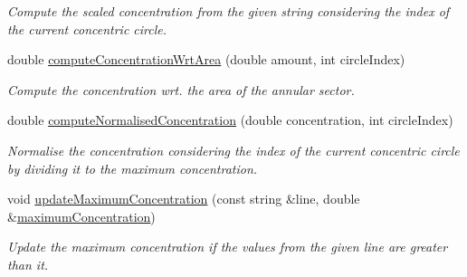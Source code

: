 \begin{DoxyCompactItemize}
\begin{DoxyCompactList}\small\item\em Compute the scaled concentration from the given string considering the index of the current concentric circle. \end{DoxyCompactList}\item 
double \hyperlink{classmultiscale_1_1video_1_1PolarCsvToInputFilesConverter_aa35b7d511b76a3c145e25886e2e76daa}{compute\-Concentration\-Wrt\-Area} (double amount, int circle\-Index)
\begin{DoxyCompactList}\small\item\em Compute the concentration wrt. the area of the annular sector. \end{DoxyCompactList}\item 
double \hyperlink{classmultiscale_1_1video_1_1PolarCsvToInputFilesConverter_a5fc03b210507a363037a694fdbc95b2b}{compute\-Normalised\-Concentration} (double concentration, int circle\-Index)
\begin{DoxyCompactList}\small\item\em Normalise the concentration considering the index of the current concentric circle by dividing it to the maximum concentration. \end{DoxyCompactList}\item 
void \hyperlink{classmultiscale_1_1video_1_1PolarCsvToInputFilesConverter_ae624c0a8fe97d266cbc127d64af707de}{update\-Maximum\-Concentration} (const string \&line, double \&\hyperlink{classmultiscale_1_1video_1_1PolarCsvToInputFilesConverter_a89b7dce2825cd5c8c45a1e6f19770e5f}{maximum\-Concentration})
\begin{DoxyCompactList}\small\item\em Update the maximum concentration if the values from the given line are greater than it. \end{DoxyCompactList}\end{DoxyCompactItemize}
